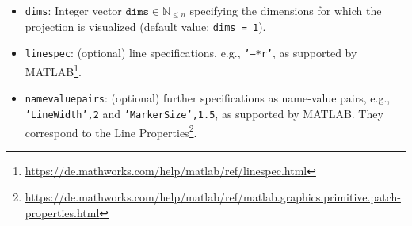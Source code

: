 \begin{itemize}
	\item \texttt{dims}: Integer vector $\texttt{dims} \in \mathbb{N}_{\leq n}$ specifying the dimensions for which the projection is visualized (default value: \texttt{dims = 1}).
	\item \texttt{linespec}: (optional) line specifications, e.g., \texttt{'--*r'}, as supported by MATLAB\footnote{\url{https://de.mathworks.com/help/matlab/ref/linespec.html}}.
	\item \texttt{namevaluepairs}: (optional) further specifications as name-value pairs, e.g.,
	\texttt{'LineWidth',2} and \texttt{'MarkerSize',1.5}, as supported by MATLAB.
	They correspond to the Line Properties\footnote{\url{https://de.mathworks.com/help/matlab/ref/matlab.graphics.primitive.patch-properties.html}}.
\end{itemize}

